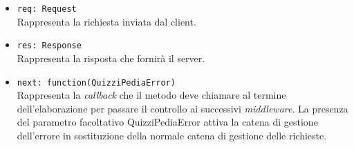 \begin{itemize}
\begin{itemize}
\begin{itemize}
		  \item
			\texttt{req: Request} \\
			Rappresenta la richiesta inviata dal client.
		  \item
			\texttt{res: Response} \\
			Rappresenta la risposta che fornirà il server.
		  \item
		    \texttt{next: function(QuizziPediaError)} \\
			Rappresenta la \textit{callback} che il metodo deve chiamare al termine dell'elaborazione per passare il controllo ai successivi \textit{middleware}. La presenza del parametro facoltativo QuizziPediaError attiva la catena di gestione dell'errore in sostituzione della normale catena di gestione delle richieste.
		 \end{itemize}
	\end{itemize}	 
\end{itemize}	
